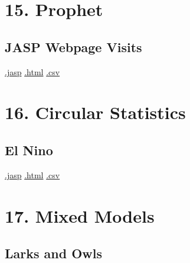 \documentclass[
  letterpaper,
  DIV=11,
  numbers=noendperiod]{scrreprt}
\begin{document}
\hypertarget{prophet}{%
\chapter{15. Prophet}\label{prophet}}

\hypertarget{jasp-webpage-visits}{%
\section{JASP Webpage Visits}\label{jasp-webpage-visits}}

\textbar{}
\href{https://github.com/jasp-stats/jasp-data-library/raw/main/JASP\%20Webpage\%20Visits/JASP\%20Webpage\%20Visits.jasp}{.jasp}
\textbar{}
\href{https://htmlpreview.github.io/?https://github.com/jasp-stats/jasp-data-library/blob/main/JASP\%20Webpage\%20Visits/index.html}{.html}
\textbar{}
\href{https://raw.githubusercontent.com/jasp-stats/jasp-data-library/main/JASP\%20Webpage\%20Visits/JASP\%20Webpage\%20Visits.csv}{.csv}


\hypertarget{circular-statistics}{%
\chapter{16. Circular Statistics}\label{circular-statistics}}

\hypertarget{el-nino}{%
\section{El Nino}\label{el-nino}}

\textbar{}
\href{https://github.com/jasp-stats/jasp-data-library/raw/main/El\%20Nino/El\%20Nino.jasp}{.jasp}
\textbar{}
\href{https://htmlpreview.github.io/?https://github.com/jasp-stats/jasp-data-library/blob/main/El\%20Nino/index.html}{.html}
\textbar{}
\href{https://raw.githubusercontent.com/jasp-stats/jasp-data-library/main/El\%20Nino/El\%20Nino.csv}{.csv}


\hypertarget{mixed-models}{%
\chapter{17. Mixed Models}\label{mixed-models}}

\hypertarget{larks-and-owls}{%
\section{Larks and Owls}\label{larks-and-owls}}
\end{document}

